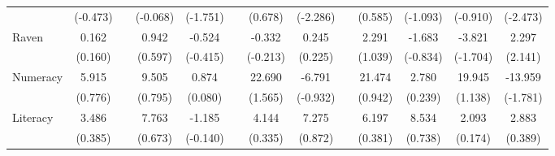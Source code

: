 \begin{table}[htbp]
{\begin{tabular}{lcccccccccccc}
          & (-0.473) &       & (-0.068) & (-1.751) &       & (0.678) & (-2.286) &       & (0.585) & (-1.093) & (-0.910) & (-2.473) \\
    Raven & 0.162 &       & 0.942 & -0.524 &       & -0.332 & 0.245 &       & 2.291 & -1.683 & \cellcolor[rgb]{ 1,  1,  0}-3.821 & \cellcolor[rgb]{ 1,  1,  0}2.297 \\
          & (0.160) &       & (0.597) & (-0.415) &       & (-0.213) & (0.225) &       & (1.039) & (-0.834) & (-1.704) & (2.141) \\
    Numeracy & 5.915 &       & 9.505 & 0.874 &       & 22.690 & -6.791 &       & 21.474 & 2.780 & 19.945 & \cellcolor[rgb]{ 1,  1,  0}-13.959 \\
          & (0.776) &       & (0.795) & (0.080) &       & (1.565) & (-0.932) &       & (0.942) & (0.239) & (1.138) & (-1.781) \\
    Literacy & 3.486 &       & 7.763 & -1.185 &       & 4.144 & 7.275 &       & 6.197 & 8.534 & 2.093 & 2.883 \\
          & (0.385) &       & (0.673) & (-0.140) &       & (0.335) & (0.872) &       & (0.381) & (0.738) & (0.174) & (0.389) \\



\end{tabular}}
\end{table}

